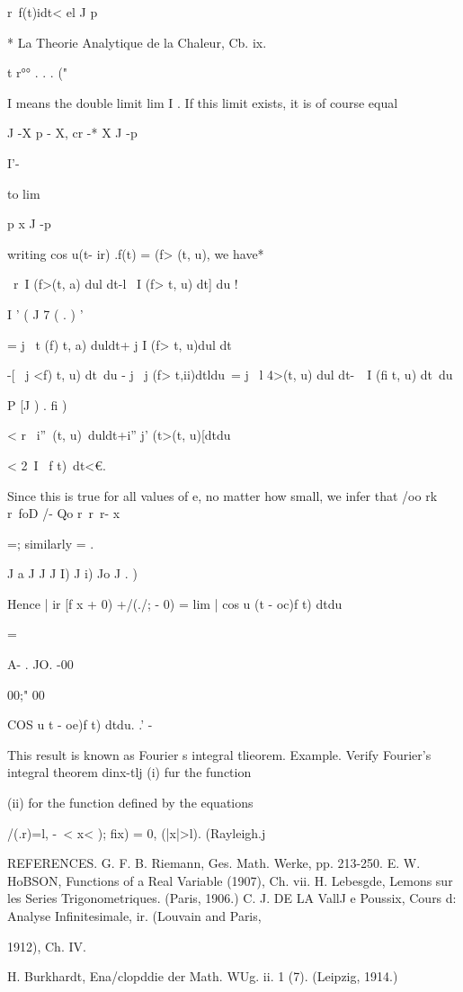 r\ f(t)idt< el J p

* La Theorie Analytique de la Chaleur, Cb. ix.

t r°° . . . ("

I means the double limit lim I . If this limit exists, it is of course
equal

J -X p -  X, cr -* X J -p

I'-

to lim

p x J -p

%
%

writing cos u(t- ir) .f(t) = (f> (t, u), we have*

\ r\ I (f>(t, a) dul dt-l \ I (f> t, u) dt] du !

I ' ( J 7 ( . ) '

= j \ t (f) t, a) duldt+ j I (f> t, u)dul dt

-[ \ j <f) t, u) dt\ du - j \ j (f> t,ii)dtldu\ = j \ l 4>(t, u) dul
dt-\ \ I (fi t, u) dt\ du

  P [J ) . fi )

< r \ i''\ < t>(t, u)\ duldt+i'' j' (t>(t, u)[dtdu

< 2\ I \ f t)\ dt<€.

Since this is true for all values of e, no matter how small, we infer
that /oo rk r\ foD /- Qo r\ r\ r- x

=; similarly = .

J a J J J I) J i) Jo J . )

Hence | ir [f x + 0) +/(./; - 0) = lim | cos u (t - oc)f t) dtdu

=

A- . JO. -00

00;" 00

COS u t - oe)f t) dtdu. .' -

This result is known as Fourier s integral tlieorem. Example. Verify
Fourier's integral theorem dinx-tlj (i) fur the function

(ii) for the function defined by the equations

/(.r)=l, -\ < x< ); fix) = 0, (|x|>l). (Rayleigh.j

REFERENCES. G. F. B. Riemann, Ges. Math. Werke, pp. 213-250. E. W.
HoBSON, Functions of a Real Variable (1907), Ch. vii. H. Lebesgde,
Lemons sur les Series Trigonometriques. (Paris, 1906.) C. J. DE LA
VallJ e Poussix, Cours d: Analyse Infinitesimale, ir. (Louvain and
Paris,

1912), Ch. IV.

H. Burkhardt, Ena/clopddie der Math. WUg. ii. 1 (7). (Leipzig, 1914.)

